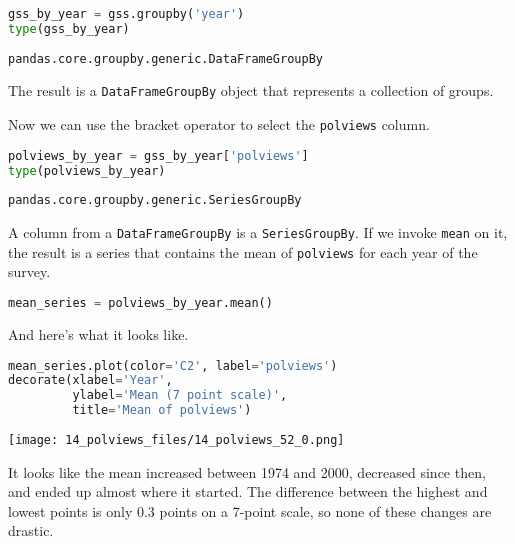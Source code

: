 \begin{lstlisting}[language=Python,style=source]
gss_by_year = gss.groupby('year')
type(gss_by_year)
\end{lstlisting}

\begin{lstlisting}[style=output]
pandas.core.groupby.generic.DataFrameGroupBy
\end{lstlisting}

The result is a \passthrough{\lstinline!DataFrameGroupBy!} object that
represents a collection of groups.

Now we can use the bracket operator to select the
\passthrough{\lstinline!polviews!} column.

\begin{lstlisting}[language=Python,style=source]
polviews_by_year = gss_by_year['polviews']
type(polviews_by_year)
\end{lstlisting}

\begin{lstlisting}[style=output]
pandas.core.groupby.generic.SeriesGroupBy
\end{lstlisting}

A column from a \passthrough{\lstinline!DataFrameGroupBy!} is a
\passthrough{\lstinline!SeriesGroupBy!}. If we invoke
\passthrough{\lstinline!mean!} on it, the result is a series that
contains the mean of \passthrough{\lstinline!polviews!} for each year of
the survey.

\begin{lstlisting}[language=Python,style=source]
mean_series = polviews_by_year.mean()
\end{lstlisting}

And here's what it looks like.

\begin{lstlisting}[language=Python,style=source]
mean_series.plot(color='C2', label='polviews')
decorate(xlabel='Year', 
         ylabel='Mean (7 point scale)', 
         title='Mean of polviews')
\end{lstlisting}

\begin{center}
\texttt{[image: 14\_polviews\_files/14\_polviews\_52\_0.png]}
\end{center}

It looks like the mean increased between 1974 and 2000, decreased since
then, and ended up almost where it started. The difference between the
highest and lowest points is only 0.3 points on a 7-point scale, so none
of these changes are drastic.

